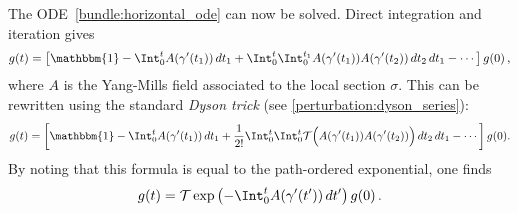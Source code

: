 \begin{example}
        The ODE~\eqref{bundle:horizontal_ode} can now be solved. Direct integration and iteration gives
        \begin{gather}
            g(t) = \left[\mathbbm{1} - \Int_0^tA(\gamma'(t_1))\,dt_1 + \Int_0^t\Int_0^{t_1}A(\gamma'(t_1))A(\gamma'(t_2))\,dt_2\,dt_1-\cdots\right]g(0)\,,
        \end{gather}
        where $A$ is the Yang-Mills field associated to the local section $\sigma$. This can be rewritten using the standard \textit{Dyson trick} (see \cref{perturbation:dyson_series}):
        \begin{gather}
            g(t) = \left[\mathbbm{1} - \Int_0^tA(\gamma'(t_1))\,dt_1 + \frac{1}{2!}\Int_0^t\Int_0^t\mathcal{T}\Bigl(A(\gamma'(t_1))A(\gamma'(t_2))\Bigr)\,dt_2\,dt_1-\cdots\right]g(0).
        \end{gather}
        By noting that this formula is equal to the path-ordered exponential, one finds
        \begin{gather}
            \label{bundle:g0_to_gt}
            g(t) = \mathcal{T}\exp\left(-\Int_0^tA(\gamma'(t'))\,dt'\right)g(0)\,.
        \end{gather}
    \end{example}


